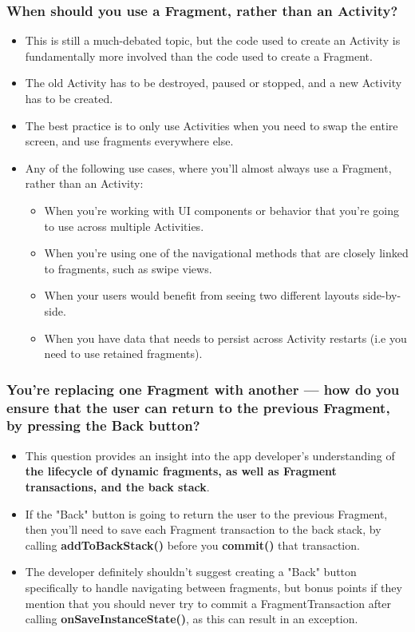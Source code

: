 \documentclass[9pt, b5paper]{article}
\begin{document}
\subsubsection{When should you use a Fragment, rather than an Activity?}
\label{sec-1-2-9}
\begin{itemize}
\item This is still a much-debated topic, but the code used to create an Activity is fundamentally more involved than the code used to create a Fragment.
\item The old Activity has to be destroyed, paused or stopped, and a new Activity has to be created.
\item The best practice is to only use Activities when you need to swap the entire screen, and use fragments everywhere else.
\item Any of the following use cases, where you'll almost always use a Fragment, rather than an Activity:
\begin{itemize}
\item When you're working with UI components or behavior that you're going to use across multiple Activities.
\item When you're using one of the navigational methods that are closely linked to fragments, such as swipe views.
\item When your users would benefit from seeing two different layouts side-by-side.
\item When you have data that needs to persist across Activity restarts (i.e you need to use retained fragments).
\end{itemize}
\end{itemize}

\subsubsection{You're replacing one Fragment with another — how do you ensure that the user can return to the previous Fragment, by pressing the Back button?}
\label{sec-1-2-10}
\begin{itemize}
\item This question provides an insight into the app developer's understanding of \textbf{the lifecycle of dynamic fragments, as well as Fragment transactions, and the back stack}.
\item If the "Back" button is going to return the user to the previous Fragment, then you'll need to save each Fragment transaction to the back stack, by calling \textbf{addToBackStack()} before you \textbf{commit()} that transaction.
\item The developer definitely shouldn't suggest creating a "Back" button specifically to handle navigating between fragments, but bonus points if they mention that you should never try to commit a FragmentTransaction after calling \textbf{onSaveInstanceState()}, as this can result in an exception.
\end{itemize}
\end{document}
